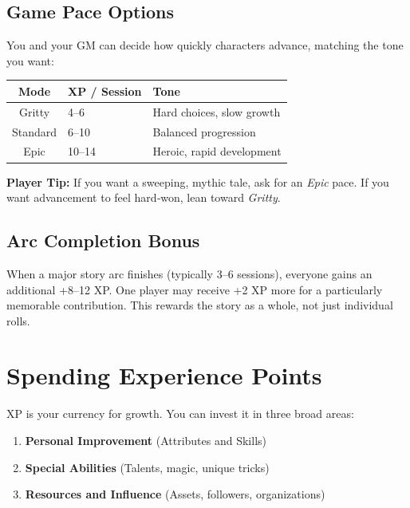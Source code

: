 \subsection{Game Pace Options}
\label{sec:game-pace}
You and your GM can decide how quickly characters advance, matching the tone
you want:

\begin{center}
\begin{tabular}{cll}
\toprule
\textbf{Mode} & \textbf{XP / Session} & \textbf{Tone} \\
\midrule
Gritty   & 4--6  & Hard choices, slow growth \\
Standard & 6--10 & Balanced progression \\
Epic     & 10--14 & Heroic, rapid development \\
\bottomrule
\end{tabular}
\end{center}

\noindent\textbf{Player Tip:} If you want a sweeping, mythic tale, ask for an
\emph{Epic} pace. If you want advancement to feel hard‑won, lean toward
\emph{Gritty}.

\subsection{Arc Completion Bonus}
\label{sec:arc-bonus}
When a major story arc finishes (typically 3–6 sessions), everyone gains an
additional +8–12 XP. One player may receive +2 XP more for a particularly
memorable contribution. This rewards the story as a whole, not just individual
rolls.

\section{Spending Experience Points}
\label{sec:spending-xp}

XP is your currency for growth. You can invest it in three broad areas:

\begin{enumerate}
  \item \textbf{Personal Improvement} (Attributes and Skills)
  \item \textbf{Special Abilities} (Talents, magic, unique tricks)
  \item \textbf{Resources and Influence} (Assets, followers, organizations)
\end{enumerate}

